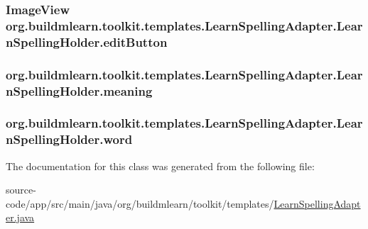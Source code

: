 \subsubsection[{\texorpdfstring{edit\+Button}{editButton}}]{\setlength{\rightskip}{0pt plus 5cm}Image\+View org.\+buildmlearn.\+toolkit.\+templates.\+Learn\+Spelling\+Adapter.\+Learn\+Spelling\+Holder.\+edit\+Button}\hypertarget{classorg_1_1buildmlearn_1_1toolkit_1_1templates_1_1LearnSpellingAdapter_1_1LearnSpellingHolder_a5db8d3295fb4eee7a87b536b32ad4082}{}\label{classorg_1_1buildmlearn_1_1toolkit_1_1templates_1_1LearnSpellingAdapter_1_1LearnSpellingHolder_a5db8d3295fb4eee7a87b536b32ad4082}
\subsubsection[{\texorpdfstring{meaning}{meaning}}]{ org.\+buildmlearn.\+toolkit.\+templates.\+Learn\+Spelling\+Adapter.\+Learn\+Spelling\+Holder.\+meaning}\hypertarget{classorg_1_1buildmlearn_1_1toolkit_1_1templates_1_1LearnSpellingAdapter_1_1LearnSpellingHolder_afbe6d699245b23d551f1bf5105e842a6}{}\label{classorg_1_1buildmlearn_1_1toolkit_1_1templates_1_1LearnSpellingAdapter_1_1LearnSpellingHolder_afbe6d699245b23d551f1bf5105e842a6}
\subsubsection[{\texorpdfstring{word}{word}}]{ org.\+buildmlearn.\+toolkit.\+templates.\+Learn\+Spelling\+Adapter.\+Learn\+Spelling\+Holder.\+word}\hypertarget{classorg_1_1buildmlearn_1_1toolkit_1_1templates_1_1LearnSpellingAdapter_1_1LearnSpellingHolder_a6e8838ae9bf29b6005fe9fff6a174e77}{}\label{classorg_1_1buildmlearn_1_1toolkit_1_1templates_1_1LearnSpellingAdapter_1_1LearnSpellingHolder_a6e8838ae9bf29b6005fe9fff6a174e77}


The documentation for this class was generated from the following file\+:\begin{DoxyCompactItemize}
\item 
source-\/code/app/src/main/java/org/buildmlearn/toolkit/templates/\hyperlink{LearnSpellingAdapter_8java}{Learn\+Spelling\+Adapter.\+java}\end{DoxyCompactItemize}
